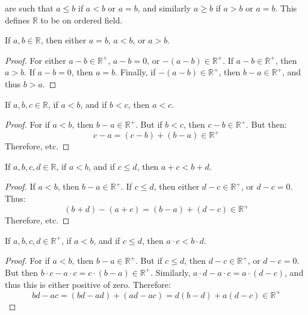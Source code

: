             are such that $a\leq{b}$ if $a<b$ or $a=b$, and
            similarly $a\geq{b}$ if $a>b$ or $a=b$. This defines
            $\mathbb{R}$ to be on ordered field.
            \begin{theorem}
                If $a,b\in\mathbb{R}$, then either $a=b$, $a<b$, or
                $a>b$.
            \end{theorem}
            \begin{proof}
                For either $a-b\in\mathbb{R}^{+}$, $a-b=0$, or
                $\minus(a-b)\in\mathbb{R}^{+}$. If
                $a-b\in\mathbb{R}^{+}$, then $a>b$. If $a-b=0$, then
                $a=b$. Finally, if $\minus(a-b)\in\mathbb{R}^{+}$,
                then $b-a\in\mathbb{R}^{+}$, and thus $b>a$.
            \end{proof}
            \begin{theorem}
                If $a,b,c\in\mathbb{R}$, if $a<b$, and if $b<c$, then
                $a<c$.
            \end{theorem}
            \begin{proof}
                For if $a<b$, then $b-a\in\mathbb{R}^{+}$. But if
                $b<c$, then $c-b\in\mathbb{R}^{+}$. But then:
                \begin{equation}
                    c-a=(c-b)+(b-a)\in\mathbb{R}^{+}
                \end{equation}
                Therefore, etc.
            \end{proof}
            \begin{theorem}
                If $a,b,c,d\in\mathbb{R}$, if $a<b$, and if
                $c\leq{d}$, then $a+c<b+d$.
            \end{theorem}
            \begin{proof}
                If $a<b$, then $b-a\in\mathbb{R}^{+}$. If $c\leq{d}$,
                then either $d-c\in\mathbb{R}^{+}$, or $d-c=0$. Thus:
                \begin{equation}
                    (b+d)-(a+c)=(b-a)+(d-c)\in\mathbb{R}^{+}
                \end{equation}
                Therefore, etc.
            \end{proof}
            \begin{theorem}
                If $a,b,c,d\in\mathbb{R}^{+}$, if $a<b$, and if
                $c\leq{d}$, then $a\cdot{c}<b\cdot{d}$.
            \end{theorem}
            \begin{proof}
                For if $a<b$, then $b-a\in\mathbb{R}^{+}$. But if
                $c\leq{d}$, then $d-c\in\mathbb{R}^{+}$, or
                $d-c=0$. But then
                $b\cdot{c}-a\cdot{c}=c\cdot(b-a)\in\mathbb{R}^{+}$.
                Similarly,
                $a\cdot{d}-a\cdot{c}=a\cdot(d-c)$, and thus this is
                either positive of zero. Therefore:
                \begin{equation}
                    bd-ac=(bd-ad)+(ad-ac)=
                    d(b-d)+a(d-c)\in\mathbb{R}^{+}
                \end{equation}
            \end{proof}
